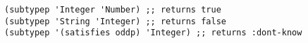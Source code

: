 \begin{lstlisting}[style=reclojureClojure]
(subtypep 'Integer 'Number) ;; returns true
(subtypep 'String 'Integer) ;; returns false
(subtypep '(satisfies oddp) 'Integer) ;; returns :dont-know
\end{lstlisting}
